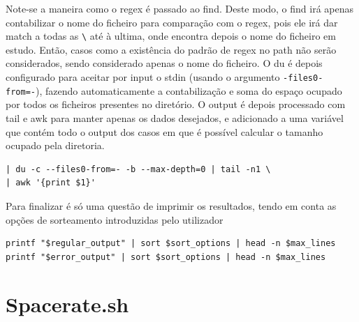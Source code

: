 Note-se a maneira como o regex é passado ao find. Deste
modo, o find irá apenas contabilizar o nome do ficheiro para
comparação com o regex, pois ele irá dar match a todas as
\verb|\| até à ultima, onde encontra depois o nome do
ficheiro em estudo. Então, casos como a existência do padrão
de regex no path não serão considerados, sendo considerado
apenas o nome do ficheiro.
O du é depois configurado para aceitar por input o stdin
(usando o argumento \verb|-files0-from=-|), fazendo
automaticamente a contabilização e soma do espaço ocupado
por todos os ficheiros presentes no diretório. O output é
depois processado com tail e awk para manter apenas os dados
desejados, e adicionado a uma variável que contém todo o
output dos casos em que é possível calcular o tamanho
ocupado pela diretoria.
\begin{verbatim}
| du -c --files0-from=- -b --max-depth=0 | tail -n1 \ 
| awk '{print $1}'
\end{verbatim}
Para finalizar é só uma questão de imprimir os resultados,
tendo em conta as opções de sorteamento introduzidas pelo
utilizador
\begin{verbatim}
printf "$regular_output" | sort $sort_options | head -n $max_lines
printf "$error_output" | sort $sort_options | head -n $max_lines
\end{verbatim}

\section{Spacerate.sh}
